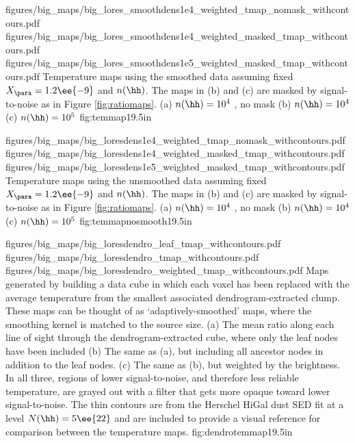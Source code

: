 \RotFigureThreeAA
{figures/big_maps/big_lores_smoothdens1e4_weighted_tmap_nomask_withcontours.pdf}
{figures/big_maps/big_lores_smoothdens1e4_weighted_masked_tmap_withcontours.pdf}
{figures/big_maps/big_lores_smoothdens1e5_weighted_masked_tmap_withcontours.pdf}
{Temperature maps using the smoothed data assuming fixed $X_{\para}=1.2\ee{-9}$
and $n(\hh)$.  The maps in (b) and (c) are masked by signal-to-noise as in Figure
\ref{fig:ratiomaps}.
(a) $n(\hh) = 10^4$ \percc, no mask
(b) $n(\hh) = 10^4$ \percc
(c) $n(\hh) = 10^5$ \percc
}
{fig:temmap}{1}{9.5in}

\RotFigureThreeAA
{figures/big_maps/big_loresdens1e4_weighted_tmap_nomask_withcontours.pdf}
{figures/big_maps/big_loresdens1e4_weighted_masked_tmap_withcontours.pdf}
{figures/big_maps/big_loresdens1e5_weighted_masked_tmap_withcontours.pdf}
{Temperature maps using the unsmoothed data assuming fixed $X_{\para}=1.2\ee{-9}$
and $n(\hh)$.  The maps in (b) and (c) are masked by signal-to-noise as in Figure
\ref{fig:ratiomaps}.
(a) $n(\hh) = 10^4$ \percc, no mask
(b) $n(\hh) = 10^4$ \percc
(c) $n(\hh) = 10^5$ \percc
}
{fig:temmapnosmooth}{1}{9.5in}




\RotFigureThreeAA
{figures/big_maps/big_loresdendro_leaf_tmap_withcontours.pdf}
{figures/big_maps/big_loresdendro_tmap_withcontours.pdf}
{figures/big_maps/big_loresdendro_weighted_tmap_withcontours.pdf}
{Maps generated by building a data cube in which each voxel has been replaced
with the average temperature from the smallest associated dendrogram-extracted
clump.  These maps can be thought of as `adaptively-smoothed' maps, where the
smoothing kernel is matched to the source size.
(a) The mean ratio along each line of sight through the dendrogram-extracted
cube, where only the leaf nodes have been included
\newline
(b) The same as (a), but including all ancestor nodes in addition to the leaf
nodes. 
\newline
(c) The same as (b), but weighted by the \threeohthree brightness.
\newline
In all three, regions of lower signal-to-noise, and therefore less reliable
temperature, are grayed out with a filter that gets more opaque toward lower
signal-to-noise.  The thin contours are from the Herschel HiGal
dust SED fit at a level $N(\hh)=5\ee{22}$ and are included to provide a visual
reference for comparison between the temperature maps.
}
{fig:dendrotemmap}{1}{9.5in}

